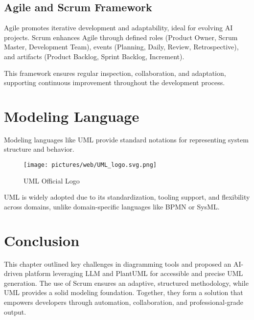 \subsection{Agile and Scrum Framework}

Agile promotes iterative development and adaptability, ideal for evolving AI projects. Scrum enhances Agile through defined roles (Product Owner, Scrum Master, Development Team), events (Planning, Daily, Review, Retrospective), and artifacts (Product Backlog, Sprint Backlog, Increment).

This framework ensures regular inspection, collaboration, and adaptation, supporting continuous improvement throughout the development process.

\section{Modeling Language}

Modeling languages like UML provide standard notations for representing system structure and behavior.

\begin{figure}[htbp]
\centering
\texttt{[image: pictures/web/UML\_logo.svg.png]}
\caption{UML Official Logo}
\label{fig:uml_logo}
\end{figure}

UML is widely adopted due to its standardization, tooling support, and flexibility across domains, unlike domain-specific languages like BPMN or SysML.

\section{Conclusion}

This chapter outlined key challenges in diagramming tools and proposed an AI-driven platform leveraging LLM and PlantUML for accessible and precise UML generation. The use of Scrum ensures an adaptive, structured methodology, while UML provides a solid modeling foundation. Together, they form a solution that empowers developers through automation, collaboration, and professional-grade output.